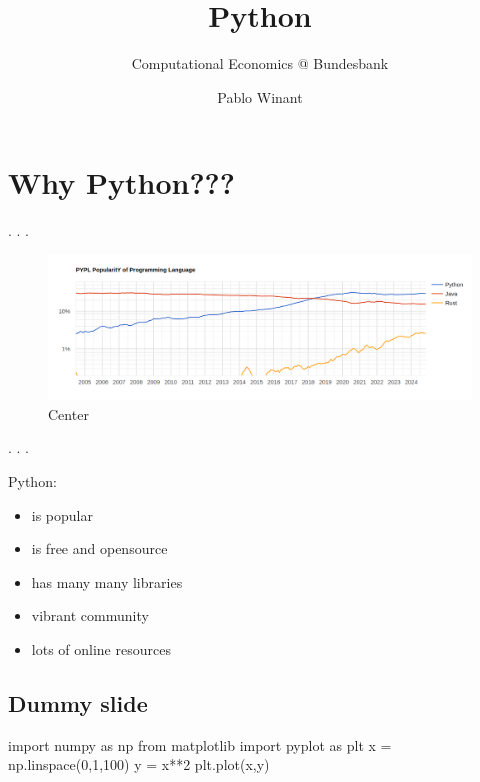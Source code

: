 \documentclass[
  letterpaper,
  DIV=11,
  numbers=noendperiod]{scrartcl}
\title{Python}
\subtitle{Computational Economics @ Bundesbank}
\author{Pablo Winant}
\date{}
\newenvironment{Shaded}{\begin{snugshade}}{\end{snugshade}}
\newcommand{\DecValTok}[1]{\textcolor[rgb]{0.68,0.00,0.00}{#1}}
\newcommand{\ImportTok}[1]{\textcolor[rgb]{0.00,0.46,0.62}{#1}}
\newcommand{\NormalTok}[1]{\textcolor[rgb]{0.00,0.23,0.31}{#1}}
\newcommand{\OperatorTok}[1]{\textcolor[rgb]{0.37,0.37,0.37}{#1}}
\providecommand{\tightlist}{%
  \setlength{\itemsep}{0pt}\setlength{\parskip}{0pt}}\usepackage{longtable,booktabs,array}
\begin{document}
\maketitle

\section{Why Python???}\label{why-python}

. . .

\begin{figure}[H]

{\centering \includegraphics{graphs/popularity.png}

}

\caption{Center}

\end{figure}%

. . .

Python:

\begin{itemize}
\tightlist
\item
  is popular
\item
  is free and opensource
\item
  has many many libraries
\item
  vibrant community
\item
  lots of online resources
\end{itemize}

\subsection{Dummy slide}\label{dummy-slide}

\begin{Shaded}
\begin{Highlighting}[]
\ImportTok{import}\NormalTok{ numpy }\ImportTok{as}\NormalTok{ np}
\ImportTok{from}\NormalTok{ matplotlib }\ImportTok{import}\NormalTok{ pyplot }\ImportTok{as}\NormalTok{ plt}
\NormalTok{x }\OperatorTok{=}\NormalTok{ np.linspace(}\DecValTok{0}\NormalTok{,}\DecValTok{1}\NormalTok{,}\DecValTok{100}\NormalTok{)}
\NormalTok{y }\OperatorTok{=}\NormalTok{ x}\OperatorTok{**}\DecValTok{2}
\NormalTok{plt.plot(x,y)}
\end{Highlighting}
\end{Shaded}
\end{document}
